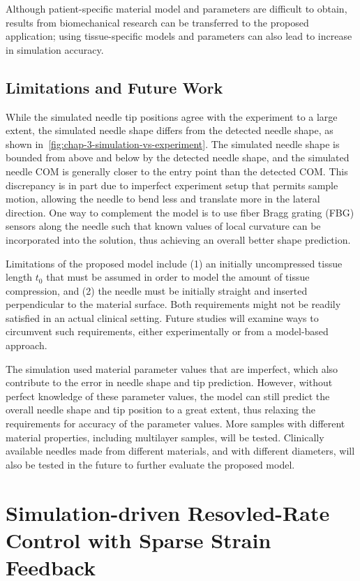 Although patient-specific material model and parameters are difficult to obtain, results from biomechanical research can be transferred to the proposed application; using tissue-specific models and parameters can also lead to increase in simulation accuracy.

\subsection{Limitations and Future Work}
\label{sec:chap-3-limitations-and-future-work}

While the simulated needle tip positions agree with the experiment to a large extent, the simulated needle shape differs from the detected needle shape, as shown in~\cref{fig:chap-3-simulation-vs-experiment}. The simulated needle shape is bounded from above and below by the detected needle shape, and the simulated needle COM is generally closer to the entry point than the detected COM. This discrepancy is in part due to imperfect experiment setup that permits sample motion, allowing the needle to bend less and translate more in the lateral direction. One way to complement the model is to use fiber Bragg grating (FBG) sensors along the needle such that known values of local curvature can be incorporated into the solution, thus achieving an overall better shape prediction.

Limitations of the proposed model include (1) an initially uncompressed tissue length $t_0$ that must be assumed in order to model the amount of tissue compression, and (2) the needle must be initially straight and inserted perpendicular to the material surface. Both requirements might not be readily satisfied in an actual clinical setting. Future studies will examine ways to circumvent such requirements, either experimentally or from a model-based approach.

The simulation used material parameter values that are imperfect, which also contribute to the error in needle shape and tip prediction. However, without perfect knowledge of these parameter values, the model can still predict the overall needle shape and tip position to a great extent, thus relaxing the requirements for accuracy of the parameter values. More samples with different material properties, including multilayer samples, will be tested. Clinically available needles made from different materials, and with different diameters, will also be tested in the future to further evaluate the proposed model.

\section{Simulation-driven Resovled-Rate Control with Sparse Strain Feedback}
\label{sec:chap-3-control}

